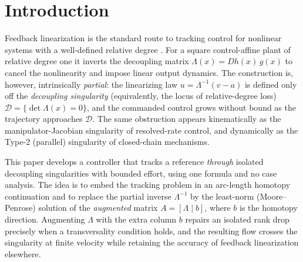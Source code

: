 \documentclass[11pt,american]{article}
\theoremstyle{definition}
\theoremstyle{plain}
\theoremstyle{remark}
\begin{document}
\section{Introduction}

Feedback linearization is the standard route to tracking control for nonlinear systems with a well-defined relative degree \cite{Isidori1995,SlotineLi1991,Khalil2002}. For a square control-affine plant of relative degree one it inverts the decoupling matrix $\Lambda(x) = Dh(x)\,g(x)$ to cancel the nonlinearity and impose linear output dynamics. The construction is, however, intrinsically \emph{partial}: the linearizing law $u = \Lambda^{-1}(v - a)$ is defined only off the \emph{decoupling singularity} (equivalently, the locus of relative-degree loss) $\mathcal D = \{\det\Lambda(x) = 0\}$, and the commanded control grows without bound as the trajectory approaches $\mathcal D$. The same obstruction appears kinematically as the manipulator-Jacobian singularity of resolved-rate control, and dynamically as the Type-2 (parallel) singularity of closed-chain mechanisms.

This paper develops a controller that tracks a reference \emph{through} isolated decoupling singularities with bounded effort, using one formula and no case analysis. The idea is to embed the tracking problem in an arc-length homotopy continuation and to replace the partial inverse $\Lambda^{-1}$ by the least-norm (Moore--Penrose) solution of the \emph{augmented} matrix $A = [\Lambda \mid b]$, where $b$ is the homotopy direction. Augmenting $\Lambda$ with the extra column $b$ repairs an isolated rank drop precisely when a transversality condition holds, and the resulting flow crosses the singularity at finite velocity while retaining the accuracy of feedback linearization elsewhere.
\end{document}
